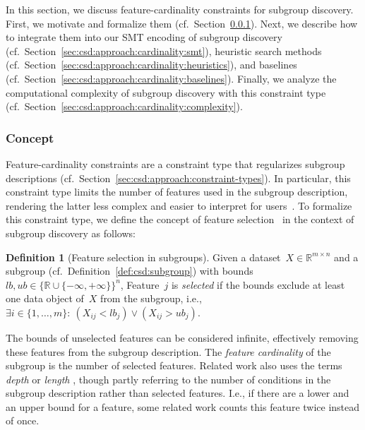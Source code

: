 \documentclass{article}
\theoremstyle{definition}
\newtheorem{definition}{Definition}
\begin{document}
In this section, we discuss feature-cardinality constraints for subgroup discovery.
First, we motivate and formalize them (cf.~Section~\ref{sec:csd:approach:cardinality:concept}).
Next, we describe how to integrate them into our SMT encoding of subgroup discovery (cf.~Section~\ref{sec:csd:approach:cardinality:smt}), heuristic search methods (cf.~Section~\ref{sec:csd:approach:cardinality:heuristics}), and baselines (cf.~Section~\ref{sec:csd:approach:cardinality:baselines}).
Finally, we analyze the computational complexity of subgroup discovery with this constraint type (cf.~Section~\ref{sec:csd:approach:cardinality:complexity}).

\subsubsection{Concept}
\label{sec:csd:approach:cardinality:concept}

Feature-cardinality constraints are a constraint type that regularizes subgroup descriptions (cf.~Section~\ref{sec:csd:approach:constraint-types}).
In particular, this constraint type limits the number of features used in the subgroup description, rendering the latter less complex and easier to interpret for users~\cite{meeng2021real}.
To formalize this constraint type, we define the concept of feature selection~\cite{guyon2003introduction, li2017feature} in the context of subgroup discovery as follows:
%
\begin{definition}[Feature selection in subgroups]
	Given a dataset~$X \in \mathbb{R}^{m \times n}$ and a subgroup (cf.~Definition~\ref{def:csd:subgroup}) with bounds~$\mathit{lb}, \mathit{ub} \in \{\mathbb{R} \cup \{-\infty, +\infty\}\}^n$,
	Feature~$j$ is \emph{selected} if the bounds exclude at least one data object of~$X$ from the subgroup, i.e., $\exists i \in \{1, \dots, m\}:~ \left( X_{ij} < \mathit{lb}_j \right) \lor \left( X_{ij} > \mathit{ub}_j \right)$.
	\label{def:csd:feature-selection}
\end{definition}
%
The bounds of unselected features can be considered infinite, effectively removing these features from the subgroup description.
The \emph{feature cardinality} of the subgroup is the number of selected features.
Related work also uses the terms \emph{depth} \cite{meeng2021real} or \emph{length} \cite{atzmueller2015subgroup, helal2016subgroup}, though partly referring to the number of conditions in the subgroup description rather than selected features.
I.e., if there are a lower and an upper bound for a feature, some related work counts this feature twice instead of once.
\end{document}
